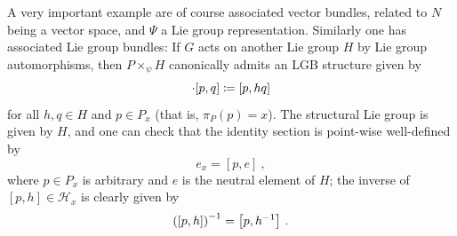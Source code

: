 \documentclass[reqno,a4paper,oneside]{amsart}
\theoremstyle{plain}
\theoremstyle{remark}
\theoremstyle{definition}
\begin{document}
A very important example are of course associated vector bundles, related to $N$ being a vector space, and $\Psi$ a Lie group representation. Similarly one has associated Lie group bundles: If $G$ acts on another Lie group $H$ by Lie group automorphisms, then $P \times_\psi H$ canonically admits an LGB structure given by
\begin{equation*}
[p, h] \cdot \mleft[p, q\mright]
\coloneqq
\mleft[ p, hq \mright]
\end{equation*}
for all $h, q \in H$ and $p \in P_x$ (that is, $\pi_P(p) = x$). The structural Lie group is given by $H$, and one can check that the identity section is point-wise well-defined by
\begin{equation*}
e_x
=
[p, e]~,
\end{equation*}
where $p \in P_x$ is arbitrary and $e$ is the neutral element of $H$; the inverse of $[p, h] \in \mathcal{H}_x$ is clearly given by
\begin{equation*}
\mleft( [p, h] \mright)^{-1}
=
\mleft[ p, h^{-1} \mright]~.
\end{equation*}
\end{document}
